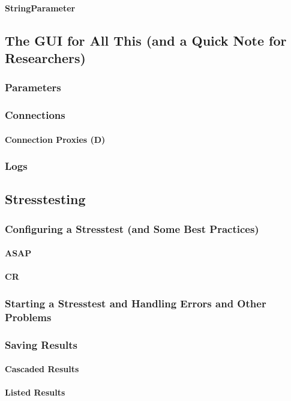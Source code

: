 \paragraph{StringParameter}
\subsection{The GUI for All This (and a Quick Note for Researchers)}
\subsubsection{Parameters}
\subsubsection{Connections}
\paragraph{Connection Proxies (D)}
\subsubsection{Logs}
\subsection{Stresstesting}
\subsubsection{Configuring a Stresstest (and Some Best Practices)}
\paragraph{ASAP}
\paragraph{CR}
\subsubsection{Starting a Stresstest and Handling Errors and Other Problems}
\subsubsection{Saving Results}
\paragraph{Cascaded Results}
\paragraph{Listed Results}